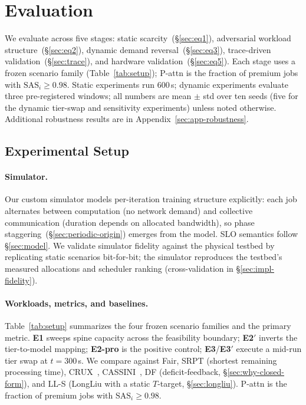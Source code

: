 \section{Evaluation}
\label{sec:eval}

We evaluate \Name across five stages: static scarcity~(\S\ref{sec:eq1}), adversarial workload structure~(\S\ref{sec:eq2}), dynamic demand reversal~(\S\ref{sec:eq3}), trace-driven validation~(\S\ref{sec:trace}), and hardware validation~(\S\ref{sec:eq5}). Each stage uses a frozen scenario family (Table~\ref{tab:setup}); P-attn is the fraction of premium jobs with $\mathrm{SAS}_i \ge 0.98$. Static experiments run 600\,s; dynamic experiments evaluate three pre-registered windows; all numbers are mean $\pm$ std over ten seeds (five for the dynamic tier-swap and sensitivity experiments) unless noted otherwise. Additional robustness results are in Appendix~\ref{sec:app-robustness}.

\subsection{Experimental Setup}
\label{sec:setup}

\paragraph{Simulator.}
Our custom simulator models per-iteration training structure explicitly: each job alternates between computation (no network demand) and collective communication (duration depends on allocated bandwidth), so phase staggering~(\S\ref{sec:periodic-origin}) emerges from the model. SLO semantics follow \S\ref{sec:model}. We validate simulator fidelity against the physical testbed by replicating static scenarios bit-for-bit; the simulator reproduces the testbed's measured allocations and scheduler ranking (cross-validation in \S\ref{sec:impl-fidelity}).

\paragraph{Workloads, metrics, and baselines.}
Table~\ref{tab:setup} summarizes the four frozen scenario families and the primary metric. \textbf{E1} sweeps spine capacity across the feasibility boundary; \textbf{E2$'$} inverts the tier-to-model mapping; \textbf{E2-pro} is the positive control; \textbf{E3}/\textbf{E3$'$} execute a mid-run tier swap at $t{=}300$\,s. We compare against Fair, SRPT (shortest remaining processing time), CRUX~\cite{Crux}, CASSINI~\cite{Cassini}, DF (deficit-feedback, \S\ref{sec:why-closed-form}), and LL-S (LongLiu with a static $T$-target, \S\ref{sec:longliu}). P-attn is the fraction of premium jobs with $\mathrm{SAS}_i \ge 0.98$.

